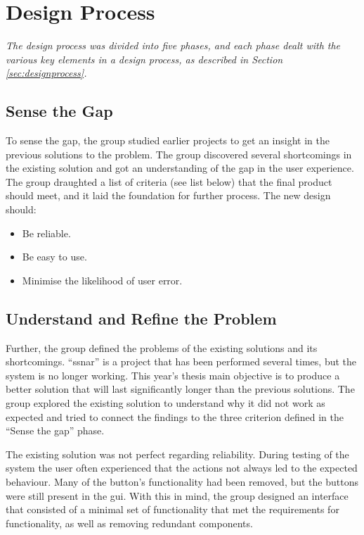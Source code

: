 \section{Design Process}
\label{secr:designproc}
\textit{The design process was divided into five phases, and each phase dealt with the various key elements in a design process, as described in Section \ref{sec:designprocess}.}

\subsection{Sense the Gap}
\label{sec:sensethegap}
To sense the gap, the group studied earlier projects to get an insight in the previous solutions to the problem. The group discovered several shortcomings in the existing solution and got an understanding of the gap in the user experience. The group draughted a list of criteria (see list below) that the final product should meet, and it laid the foundation for further process. The new design should:

\begin{itemize}
    \item Be reliable.
    \item Be easy to use.
    \item Minimise the likelihood of user error.
\end{itemize}

\subsection{Understand and Refine the Problem}
\label{sec:understprob}
Further, the group defined the problems of the existing solutions and its shortcomings. ``\acrlong{ssnar}'' is a project that has been performed several times, but the system is no longer working. This year's thesis main objective is to produce a better solution that will last significantly longer than the previous solutions. The group explored the existing solution to understand why it did not work as expected and tried to connect the findings to the three criterion defined in the ``Sense the gap'' phase.

The existing solution was not perfect regarding reliability. During testing of the system the user often experienced that the actions not always led to the expected behaviour. Many of the button's functionality had been removed, but the buttons were still present in the \acrshort{gui}. With this in mind, the group designed an interface that consisted of a minimal set of functionality that met the requirements for functionality, as well as removing redundant components.

